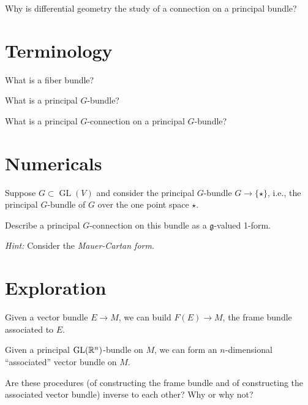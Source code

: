 \documentclass{homework}
\author{Jim Fowler}
\DeclareMathOperator{\GL}{GL}
\begin{document}
\maketitle

\begin{inspiration}
  Why is differential geometry the study of a connection on a principal bundle?
\end{inspiration}

\section{Terminology}

\begin{problem}
 What is a fiber bundle? 
\end{problem}

\begin{problem}
  What is a principal $G$-bundle?
\end{problem}

\begin{problem}
  What is a principal $G$-connection on a principal $G$-bundle? 
\end{problem}

\section{Numericals}

\begin{problem} Suppose $G \subset \GL(V)$ and consider the principal
$G$-bundle $G \to \{\star\}$, i.e., the principal $G$-bundle of $G$
over the one point space $\star$.
  
Describe a principal $G$-connection on this bundle as a $\mathfrak{g}$-valued 1-form.

\textit{Hint:}
 Consider the \textit{Mauer-Cartan form}.
\end{problem}

\section{Exploration}

\begin{problem} Given a vector bundle $E \to M$, we can build $F(E)
\to M$, the frame bundle associated to $E$.

  Given a principal $\GL(\R^n)$-bundle on $M$, we can form an
$n$-dimensional ``associated'' vector bundle on $M$.

Are these procedures (of constructing the frame bundle and of
constructing the associated vector bundle) inverse to each other?  Why
or why not?
\end{problem}
\end{document}
